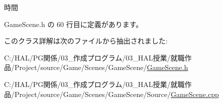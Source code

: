 時間 



 Game\+Scene.\+h の 60 行目に定義があります。



このクラス詳解は次のファイルから抽出されました\+:\begin{DoxyCompactItemize}
\item 
C\+:/\+H\+A\+L/\+P\+G関係/03\+\_\+作成プログラム/03\+\_\+\+H\+A\+L授業/就職作品/\+Project/source/\+Game/\+Scenes/\+Game\+Scene/\mbox{\hyperlink{_game_scene_8h}{Game\+Scene.\+h}}\item 
C\+:/\+H\+A\+L/\+P\+G関係/03\+\_\+作成プログラム/03\+\_\+\+H\+A\+L授業/就職作品/\+Project/source/\+Game/\+Scenes/\+Game\+Scene/\+Source/\mbox{\hyperlink{_game_scene_8cpp}{Game\+Scene.\+cpp}}\end{DoxyCompactItemize}
